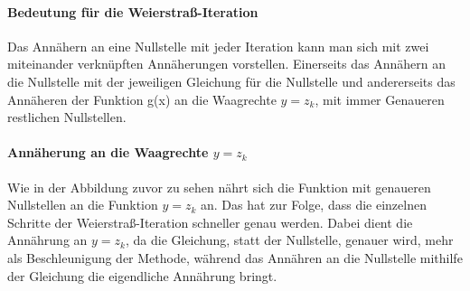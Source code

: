 \documentclass[12pt]{article}
\begin{document}
\paragraph{Bedeutung für die Weierstraß-Iteration}
Das Annähern an eine Nullstelle mit jeder Iteration kann man sich mit zwei miteinander verknüpften Annäherungen vorstellen. Einerseits das Annähern an die Nullstelle mit der jeweiligen Gleichung für die Nullstelle und andererseits das Annäheren der Funktion g(x) an die Waagrechte $y=z_k$, mit immer Genaueren restlichen Nullstellen.

\paragraph{Annäherung an die Waagrechte $y=z_k$}
Wie in der Abbildung zuvor zu sehen nährt sich die Funktion mit genaueren Nullstellen an die Funktion $y=z_k$ an. Das hat zur Folge, dass die einzelnen Schritte der Weierstraß-Iteration schneller genau werden. Dabei dient die Annährung an $y=z_k$, da die Gleichung, statt der Nullstelle, genauer wird, mehr als Beschleunigung der Methode, während das Annähren an die Nullstelle mithilfe der Gleichung die eigendliche Annährung bringt.
\end{document}
